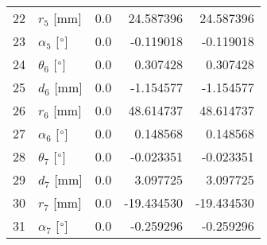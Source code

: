 \documentclass{standalone}%
\begin{document}
\begin{tabular}{llrrr}
22 &              $r_{5}$ [mm] &       0.0 &  24.587396 &  24.587396 \\
23 &  $\alpha_{5}$ [$\degree$] &       0.0 &  -0.119018 &  -0.119018 \\
24 &  $\theta_{6}$ [$\degree$] &       0.0 &   0.307428 &   0.307428 \\
25 &              $d_{6}$ [mm] &       0.0 &  -1.154577 &  -1.154577 \\
26 &              $r_{6}$ [mm] &       0.0 &  48.614737 &  48.614737 \\
27 &  $\alpha_{6}$ [$\degree$] &       0.0 &   0.148568 &   0.148568 \\
28 &  $\theta_{7}$ [$\degree$] &       0.0 &  -0.023351 &  -0.023351 \\
29 &              $d_{7}$ [mm] &       0.0 &   3.097725 &   3.097725 \\
30 &              $r_{7}$ [mm] &       0.0 & -19.434530 & -19.434530 \\
31 &  $\alpha_{7}$ [$\degree$] &       0.0 &  -0.259296 &  -0.259296 \\
\bottomrule
\end{tabular}
%
\end{document}
